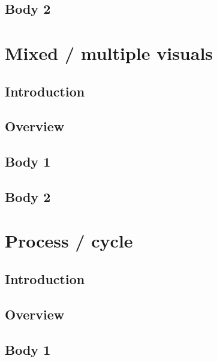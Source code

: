\documentclass[11pt,a4paper]{article}
\begin{document}
\subsection*{Body 2}
\vspace{1cm}
\clearpage
\section*{Mixed / multiple visuals}
\subsection*{Introduction}
\vspace{1cm}
\subsection*{Overview}
\vspace{1cm}
\subsection*{Body 1}
\vspace{1cm}
\subsection*{Body 2}
\vspace{1cm}
\clearpage
\section*{Process / cycle}
\subsection*{Introduction}
\vspace{1cm}
\subsection*{Overview}
\vspace{1cm}
\subsection*{Body 1}
\vspace{1cm}
\end{document}
